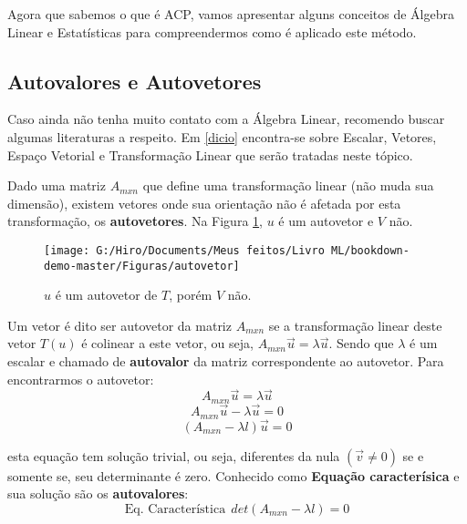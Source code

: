 \documentclass[
  openany]{book}
\begin{document}
Agora que sabemos o que é ACP, vamos apresentar alguns conceitos de Álgebra Linear e Estatísticas para compreendermos como é aplicado este método.

\hypertarget{autovalores-e-autovetores}{%
\subsection{Autovalores e Autovetores}\label{autovalores-e-autovetores}}

Caso ainda não tenha muito contato com a Álgebra Linear, recomendo buscar algumas literaturas a respeito. Em \ref{dicio} encontra-se sobre Escalar, Vetores, Espaço Vetorial e Transformação Linear que serão tratadas neste tópico.

Dado uma matriz \(A_{mxn}\) que define uma transformação linear (não muda sua dimensão), existem vetores onde sua orientação não é afetada por esta transformação, os \textbf{autovetores}. Na Figura \ref{fig:autovetor}, \(u\) é um autovetor e \(V\) não.

\begin{figure}

{\centering \texttt{[image: G:/Hiro/Documents/Meus feitos/Livro ML/bookdown-demo-master/Figuras/autovetor]} 

}

\caption{\(u\) é um autovetor de \(T\), porém \(V\) não.}\label{fig:autovetor}
\end{figure}



Um vetor é dito ser autovetor da matriz \(A_{mxn}\) se a transformação linear deste vetor \(T(u)\) é colinear a este vetor, ou seja, \(A_{mxn}\vec{u}=\lambda \vec{u}\). Sendo que \(\lambda\) é um escalar e chamado de \textbf{autovalor} da matriz correspondente ao autovetor. Para encontrarmos o autovetor:
\[A_{mxn}\vec{u}=\lambda \vec{u} \]
\[A_{mxn}\vec{u}-\lambda \vec{u}=0 \]
\begin{equation}
(A_{mxn}-\lambda l)\vec{u}=0
    \label{eq:autovetor}
\end{equation}

esta equação tem solução trivial, ou seja, diferentes da nula \((\vec{v}\neq 0 )\) se e somente se, seu determinante é zero. Conhecido como \textbf{Equação caracterísica} e sua solução são os \textbf{autovalores}:
\begin{equation}
    \mbox{Eq. Característica}\ \  det(A_{mxn}-\lambda l)=0  
    \label{eq:eqcarac}
\end{equation}
\end{document}
